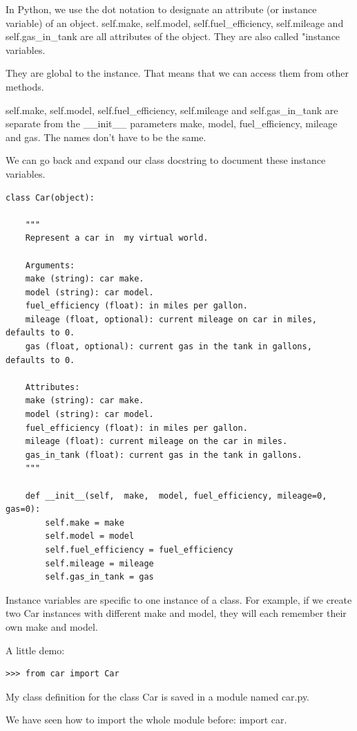 \documentclass{article}
\begin{document}
In Python, we use the dot notation to designate an attribute (or instance variable) of an object.
self.make, self.model, self.fuel{\_}efficiency, self.mileage and self.gas{\_}in{\_}tank are all attributes of the object. They are also called "instance variables.

They are global to the instance. That means that we can access them from other methods.

self.make, self.model, self.fuel{\_}efficiency, self.mileage and self.gas{\_}in{\_}tank are separate from the {\_}{\_}init{\_}{\_} parameters make, model, fuel{\_}efficiency, mileage and gas.  The names don’t have to be the same.

We can go back and expand our class docstring to document these instance variables.

\begin{lstlisting}
class Car(object):

    """
    Represent a car in  my virtual world.

    Arguments:
    make (string): car make.
    model (string): car model.
    fuel_efficiency (float): in miles per gallon.
    mileage (float, optional): current mileage on car in miles, defaults to 0.
    gas (float, optional): current gas in the tank in gallons, defaults to 0.

    Attributes:
    make (string): car make.
    model (string): car model.
    fuel_efficiency (float): in miles per gallon.
    mileage (float): current mileage on the car in miles.
    gas_in_tank (float): current gas in the tank in gallons.
    """

    def __init__(self,  make,  model, fuel_efficiency, mileage=0, gas=0):
        self.make = make
        self.model = model
        self.fuel_efficiency = fuel_efficiency
        self.mileage = mileage
        self.gas_in_tank = gas
\end{lstlisting}

Instance variables are specific to one instance of a class. For example, if we create two Car instances with different make and model, they will each remember their own make and model.

A little demo:

\begin{lstlisting}
>>> from car import Car
\end{lstlisting}

My class definition for the class Car is saved in a module named car.py.

We have seen how to import the whole module before: import car.
\end{document}
